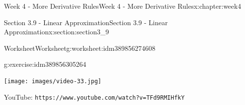 \documentclass[oneside,10pt,]{book}
\newcommand{\mono}[1]{\texttt{#1}}
\numberwithin{equation}{section}
\newlength{\qrsize}
\newlength{\previewwidth}
\begin{document}
\begin{chapterptx}{Week 4 - More Derivative Rules}{}{Week 4 - More Derivative Rules}{}{}{x:chapter:week4}
\begin{sectionptx}{Section 3.9 - Linear Approximation}{}{Section 3.9 - Linear Approximation}{}{}{x:section:section3_9}
\begin{worksheet-subsection}{Worksheet}{}{Worksheet}{}{}{g:worksheet:idm389856274608}
\begin{divisionexercise}{2}{}{}{g:exercise:idm389856305264}
\end{divisionexercise}%
\end{worksheet-subsection}
\restoregeometry
\setlength{\qrsize}{9em}
\setlength{\previewwidth}{\linewidth}
\addtolength{\previewwidth}{-\qrsize}
\begin{tcbraster}[raster columns=2, raster column skip=1pt, raster halign=center, raster force size=false, raster left skip=0pt, raster right skip=0pt]%
\begin{tcolorbox}[previewstyle, width=\previewwidth]%
\texttt{[image: images/video-33.jpg]}%
\end{tcolorbox}%
\begin{tcolorbox}[qrstyle]%
{\hypersetup{urlcolor=black}}%
\end{tcolorbox}%
\begin{tcolorbox}[captionstyle]%
\small YouTube: \mono{https://www.youtube.com/watch?v=TFd9RMIHfkY}\end{tcolorbox}%
\end{tcbraster}%
\end{sectionptx}
\end{chapterptx}
%
%
\typeout{************************************************}
\typeout{************************************************}
%
\end{document}
